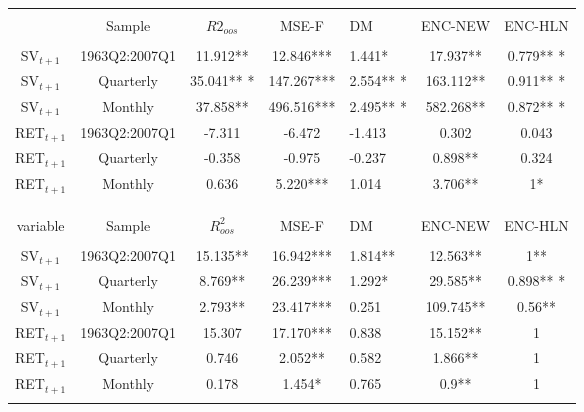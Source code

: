 \begin{table}[!htbp] \centering 
	\caption{} 
	\label{} 
	\begin{tabular}{@{\extracolsep{5pt}} ccccHcc} 
		\\[-1.8ex]\hline 
		\hline \\[-1.8ex] 
		 & Sample & $R{2}_{oos}$ & MSE-F & DM & ENC-NEW & ENC-HLN \\ 
		\hline \\[-1.8ex] 
		SV$_{t+1}$ & 1963Q2:2007Q1 & 11.912**  & 12.846*** & 1.441*  & 17.937**  & 0.779** *  \\ 
		SV$_{t+1}$ & Quarterly & 35.041** *  & 147.267*** & 2.554** *  & 163.112**  & 0.911** *  \\ 
		SV$_{t+1}$ & Monthly & 37.858**  & 496.516*** & 2.495** *  & 582.268**  & 0.872** *  \\ 
		RET$_{t+1}$ & 1963Q2:2007Q1 & -7.311 & -6.472 & -1.413 & 0.302 & 0.043 \\ 
		RET$_{t+1}$ & Quarterly & -0.358 & -0.975 & -0.237 & 0.898**  & 0.324 \\ 
		RET$_{t+1}$ & Monthly & 0.636 & 5.220*** & 1.014 & 3.706**  & 1*  \\ 
		\hline \\[-1.8ex] 
		\\[-1.8ex]\hline 
		\hline \\[-1.8ex] 
		variable & Sample & $R^{2}_{oos}$ & MSE-F & DM & ENC-NEW & ENC-HLN \\ 
		\hline \\[-1.8ex] 
		SV$_{t+1}$ & 1963Q2:2007Q1 & 15.135**  & 16.942*** & 1.814**  & 12.563**  & 1**  \\ 
		SV$_{t+1}$ & Quarterly & 8.769**  & 26.239*** & 1.292*  & 29.585**  & 0.898** *  \\ 
		SV$_{t+1}$ & Monthly & 2.793**  & 23.417*** & 0.251 & 109.745**  & 0.56**  \\ 
		RET$_{t+1}$ & 1963Q2:2007Q1 & 15.307 & 17.170*** & 0.838 & 15.152**  & 1 \\ 
		RET$_{t+1}$ & Quarterly & 0.746 & 2.052** & 0.582 & 1.866**  & 1 \\ 
		RET$_{t+1}$ & Monthly & 0.178 & 1.454* & 0.765 & 0.9**  & 1 \\ 
		\hline \\[-1.8ex] 
	\end{tabular} 
\end{table} 